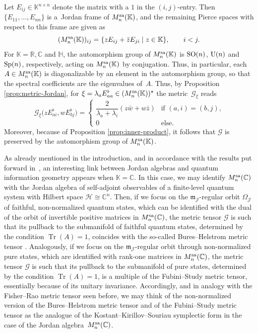 \documentclass[pdftex]{sigma}
\numberwithin{equation}{section}
\newcommand{\Jcal}{\mathcal{J}}
\newcommand{\m}{\mathfrak{m}}
\newcommand{\R}{{\mathbb R}}
\newcommand{\C}{{\mathbb C}}
\newcommand{\bH}{{\mathbb H}}
\newcommand{\K}{{\mathbb K}}
\renewcommand{\m}{{\mathfrak m}}
\newcommand{\Gcal}{\mathcal{G}}
\begin{document}
Let $E_{ij} \in \K^{n\times n}$ denote the matrix with a $1$ in the $(i,j)$-entry.
Then $\{E_{11}, \dots, E_{nn}\}$ is a~Jordan frame of $M_n^{\rm sa}(\K)$, and the remaining Pierce spaces with respect to this frame are given as
\[
(M_n^{\rm sa}(\K))_{ij} = \{ z E_{ij} + \bar z E_{ji} \mid z \in \K\}, \qquad i < j.
\]
For $\K = \R, \C$ and $\bH$, the automorphism group of $M_n^{\rm sa}(\K)$ is ${\rm SO}(n)$, ${\rm U}(n)$ and ${\rm Sp}(n)$, respectively, acting on $M_n^{\rm sa}(\K)$ by conjugation. Thus, in particular, each $A \in M_n^{\rm sa}(\K)$ is diagonalizable by an element in the automorphism group, so that the spectral coefficients are the eigenvalues of~$A$. Thus, by Proposition \ref{prop:metric-Jordan}, for $\xi = \lambda_a E_{aa}^\flat \in (M_n^{\rm sa}(\K))^\star$ the metric~$\Gcal_\xi$ reads
\[
\Gcal_\xi\big(z E_{ai}^\flat, w E_{bj}^\flat\big) = \begin{cases} \dfrac2{\lambda_a + \lambda_i} (z\bar w + w \bar z) & \text{if $(a,i) = (b,j)$,}\\[1mm] 0 & \text{else.} \end{cases}
\]
{Moreover, because of Proposition \ref{prop:inner-product}, it follows that $\Gcal$ is preserved by the automorphism group of $M_n^{\rm sa}(\K)$.}

As already mentioned in the introduction, and in accordance with the results put forward in~\cite{C-J-S-2020-02,C-J-S-2020}, an interesting link between Jordan algebras and quantum information geometry appears when $\mathbb{K}=\mathbb{C}$.
In this case, we may identify $M_n^{\rm sa}(\C)$ with the Jordan algebra of self-adjoint observables of a finite-level quantum system with Hilbert space $\mathcal{H}\cong\C^{n}$.
Then, if we focus on the $\m_{\Jcal}$-regular orbit $\Omega_{\Jcal}$ of faithful, non-normalized quantum states, which can be identified with the dual of the orbit of invertible positive matrices in $M_n^{\rm sa}(\C)$, the metric tensor $\Gcal$ is such that its pullback to the submanifold of faithful quantum states, determined by the condition $\operatorname{Tr}(A)=1$, coincides with the so-called Bures--Helstrom metric tensor \cite{B-Z-2006, Dittmann-1993, Dittmann-1995, Helstrom-1967, Helstrom-1968, Helstrom-1969, Helstrom-1976, Safranek-2017, Safranek-2018, S-A-G-P-2020, Uhlmann-1992}.
Analogously, if we focus on the $\m_{\Jcal}$-regular orbit through non-normalized pure states, which are identified with rank-one matrices in $M_n^{\rm sa}(\C)$, the metric tensor $\Gcal$ is such that its pullback to the submanifold of pure states, determined by the condition $\operatorname{Tr}(A)=1$, is a multiple of the Fubini--Study metric tensor, essentially because of its unitary invariance.
Accordingly, and in analogy with the Fisher--Rao metric tensor seen before, we may think of the non-normalized version of the Bures--Helstrom metric tensor and of the Fubini--Study metric tensor as the analogue of the Kostant--Kirillov--Souriau symplectic form in the case of the Jordan algebra~$M_n^{\rm sa}(\C)$.
\end{document}
